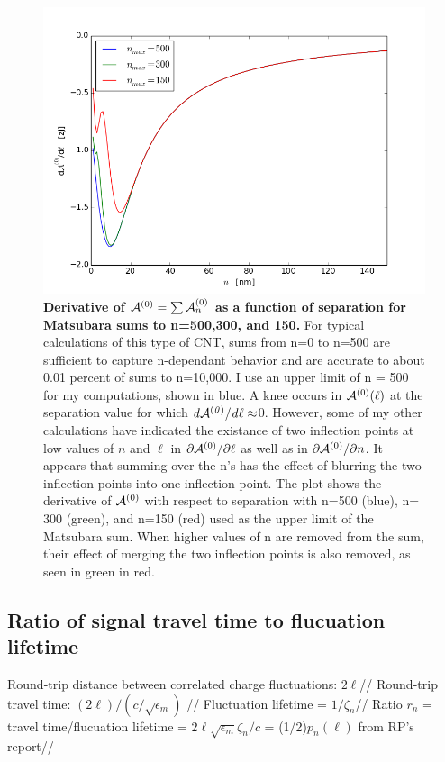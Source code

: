 \documentclass[a4paper]{article}
\begin{document}
\begin{center}
\begin{figure}[t!]
\begin{center}
\includegraphics[width=1.2\textwidth]{plots/65_dsumAdl_vs_n.png}
\hskip 43pt
\caption{{\bf Derivative of ${\cal A}^{(0)} = \sum{\cal A}_n^{(0)}$ as a function of separation for
Matsubara sums to n=500,300, and 150.}  For typical calculations of this type
of CNT, sums from n=0 to n=500 are sufficient to capture n-dependant behavior
and are accurate to about 0.01 percent of sums to
n=10,000.  I use an upper limit of n = 500 for my computations, shown in blue. A
knee occurs in ${\cal A}^{(0)}(\ell)$ at the separation value for which
$\it{d}{\cal A}^{(0)}/\it{d}\ell \approx$0.  However, some of my other calculations
have indicated the existance of two inflection points at low values of $n$ and
$\ell$ in $\partial{\cal A}^{(0)}/\partial\ell$ as well as in
$\partial{\cal A}^{(0)}/\partial n$.
It appears that summing over the n's has the effect of blurring the two
inflection points into one inflection point.  The plot shows
the derivative of ${\cal A}^{(0)}$ with respect to separation with n=500 (blue),
n= 300 (green), and n=150 (red) used as the upper limit of the Matsubara sum.
When higher values of n are removed from the sum, their effect of merging the two
inflection points is also removed, as seen in green in red. }
\label{eiz65}
\end{center}
\end{figure} 

\hskip 73pt
\end{center}

\subsection{Ratio of signal travel time to flucuation lifetime}%
Round-trip distance between correlated charge fluctuations: $2\ell$//
Round-trip travel time: $(2\ell)/(c/\sqrt{\epsilon_m})$ //
Fluctuation lifetime = $1/\zeta_n$//
Ratio $r_n$ = travel time/flucuation lifetime = $2\ell \sqrt{\epsilon_m}
\zeta_n/ c$ = (1/2)$p_n(\ell)$ from RP's report//
\end{document}
